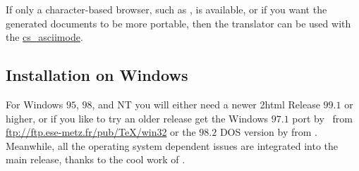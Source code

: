 %
%
\html{\\}%

If only a character-based browser, such as , is available, 
or if you want the generated documents to be more portable, 
then the translator can be used with the  
\hyperref{option}{option (see Section~}{)}{cs_asciimode}. 


\subsection{Installation on Windows}
\label{windowsinst}

%
For Windows $95$, $98$, and NT you will either need a newer
\latex2html{} Release $99.1$ or higher, or if you like to try an
older release get the Windows $97.1$ port by \Popineau\ from
\url{ftp://ftp.ese-metz.fr/pub/TeX/win32} or the $98.2$ DOS version
 by \Taupin{} from \CVSsite.
Meanwhile, all the operating system dependent issues are integrated
into the main release, thanks to the cool work of \Rouchal.

